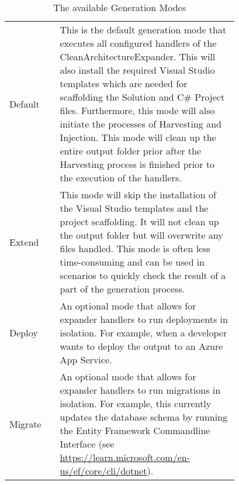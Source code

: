 \begin{table}[H]
    \begin{tabular}{ l | p{0.78\linewidth}}
        \toprule
Default & This is the default generation mode that executes all configured handlers of the
CleanArchitectureExpander. This will also install the required Visual Studio templates
which are needed for scaffolding the Solution and C\# Project files. Furthermore, this
mode will also initiate the processes of Harvesting and Injection. This mode will clean
up the entire output folder prior after the Harvesting process is finished prior to the
execution of the handlers. \\
        
Extend & This mode will skip the installation of the Visual Studio templates and the
project scaffolding. It will not clean up the output folder but will overwrite any files
handled. This mode is often less time-consuming and can be used in scenarios to quickly
check the result of a part of the generation process. \\

Deploy & An optional mode that allows for expander handlers to run deployments in
isolation. For example, when a developer wants to deploy the output to an Azure App
Service. \\
       
Migrate & An optional mode that allows for expander handlers to run migrations in
isolation. For example, this  currently updates the database schema by running the Entity
Framework Commandline Interface (see
\url{https://learn.microsoft.com/en-us/ef/core/cli/dotnet}).\\
        \bottomrule
    \end{tabular}
    \caption{The available Generation Modes}
    \label{appendix_tab_generation_modes}
\end{table}